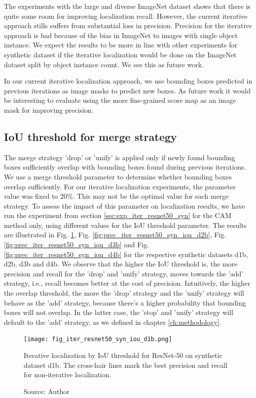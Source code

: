 The experiments with the large and diverse ImageNet dataset shows that there is quite some room for improving localization recall. However, the current iterative approach stills suffers from substantial loss in precision. Precision for the iterative approach is bad because of the bias in ImageNet to images with single object instance. We expect the results to be more in line with other experiments for synthetic dataset if the iterative localization would be done on the ImageNet dataset split by object instance count. We see this as future work.

In our current iterative localization approach, we use bounding boxes predicted in previous iterations as image masks to predict new boxes. As future work it would be interesting to evaluate using the more fine-grained score map as an image mask for improving precision.

\subsection{IoU threshold for merge strategy}
The merge strategy 'drop' or 'unify' is applied only if newly found bounding boxes sufficiently overlap with bounding boxes found during previous iterations. We use a merge threshold parameter to determine whether bounding boxes overlap sufficiently. For our iterative localization experiments, the parameter value was fixed to 20\%. This may not be the optimal value for each merge strategy. To assess the impact of this parameter on localization results, we have run the experiment from section \ref{sec:exp_iter_resnet50_syn} for the CAM method only, using different values for the IoU threshold parameter. The results are illustrated in Fig. \ref{fig:prec_iter_resnet50_syn_iou_d1b}, Fig. \ref{fig:prec_iter_resnet50_syn_iou_d2b}, Fig. \ref{fig:prec_iter_resnet50_syn_iou_d3b} and Fig. \ref{fig:prec_iter_resnet50_syn_iou_d4b} for the respective synthetic datasets d1b, d2b, d3b and d4b. We observe that the higher the IoU threshold is, the more precision and recall for the 'drop' and 'unify' strategy, moves towards the 'add' strategy, i.e., recall becomes better at the cost of precision. Intuitively, the higher the overlap threshold, the more the 'drop' strategy and the 'unify' strategy will behave as the 'add' strategy, because there's a higher probability that bounding boxes will not overlap. In the latter case, the 'stop' and 'unify' strategy will default to the 'add' strategy, as we defined in chapter \ref{ch:methodology}.

\begin{figure}[h]
    \begin{center}       
    \texttt{[image: fig\_iter\_resnet50\_syn\_iou\_d1b.png]}
    \caption[Iterative localization by IoU threshold for ResNet-50 on synthetic dataset d1b]{Iterative localization by IoU threshold for ResNet-50 on synthetic dataset d1b. The cross-hair lines mark the best precision and recall for non-iterative localization.}
    \caption*{Source: Author}
    \label{fig:prec_iter_resnet50_syn_iou_d1b}
    \end{center}
\end{figure}

